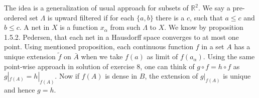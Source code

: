 
The idea is a generalization of usual approach for subsets of $\mathbb{R}^2$. We say a pre-ordered set $\Lambda$ is upward filtered if for each $\{a,b\}$ there is a $c$, such that $a \leq c$ and $b\leq c$. A net in $X$ is a function $x_{\alpha}$ from such $\Lambda$ to $X$. We know by proposition 1.5.2. Pedersen, that each net in a Hausdorff space converges to at most one point. Using mentioned proposition, each continuous function $f$ in a set $A$ has a unique extension $\tilde{f}$ on $\bar{A}$ when we take $f(a)$ as limit of $f(a_{\alpha})$. Using the same point-wise approach in solution of exercise 8, one can think of $g \circ f = h \circ f$ as $g|_{f(A)}=h|_{f(A)}$. Now if $f(A)$ is dense in $B$, the extension of $g|_{f(A)}$ is unique and hence $g=h$.

% 

